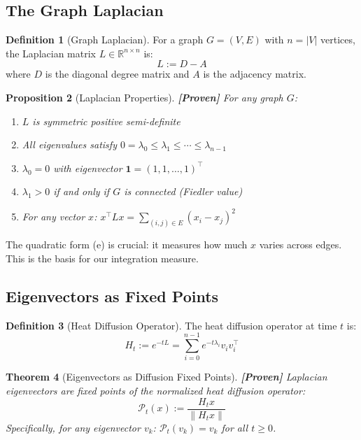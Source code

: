 \documentclass[11pt]{article}
\newtheorem{theorem}{Theorem}[section]
\newtheorem{proposition}[theorem]{Proposition}
\theoremstyle{definition}
\newtheorem{definition}[theorem]{Definition}
\theoremstyle{remark}
\begin{document}
\subsection{The Graph Laplacian}

\begin{definition}[Graph Laplacian]
For a graph $G = (V, E)$ with $n = |V|$ vertices, the Laplacian matrix $L \in \mathbb{R}^{n \times n}$ is:
\[
L := D - A
\]
where $D$ is the diagonal degree matrix and $A$ is the adjacency matrix.
\end{definition}

\begin{proposition}[Laplacian Properties]\label{prop:laplacian}
\textbf{[Proven]} For any graph $G$:
\begin{enumerate}[label=(\alph*)]
    \item $L$ is symmetric positive semi-definite
    \item All eigenvalues satisfy $0 = \lambda_0 \leq \lambda_1 \leq \cdots \leq \lambda_{n-1}$
    \item $\lambda_0 = 0$ with eigenvector $\mathbf{1} = (1, 1, \ldots, 1)^\top$
    \item $\lambda_1 > 0$ if and only if $G$ is connected (Fiedler value)
    \item For any vector $x$: $x^\top L x = \sum_{(i,j) \in E} (x_i - x_j)^2$
\end{enumerate}
\end{proposition}

The quadratic form (e) is crucial: it measures how much $x$ varies across edges. This is the basis for our integration measure.

\subsection{Eigenvectors as Fixed Points}

\begin{definition}[Heat Diffusion Operator]
The heat diffusion operator at time $t$ is:
\[
H_t := e^{-tL} = \sum_{i=0}^{n-1} e^{-t\lambda_i} v_i v_i^\top
\]
\end{definition}

\begin{theorem}[Eigenvectors as Diffusion Fixed Points]\label{thm:diffusion_fp}
\textbf{[Proven]} Laplacian eigenvectors are fixed points of the normalized heat diffusion operator:
\[
\mathcal{P}_t(x) := \frac{H_t x}{\|H_t x\|}
\]
Specifically, for any eigenvector $v_k$: $\mathcal{P}_t(v_k) = v_k$ for all $t \geq 0$.
\end{theorem}
\end{document}
